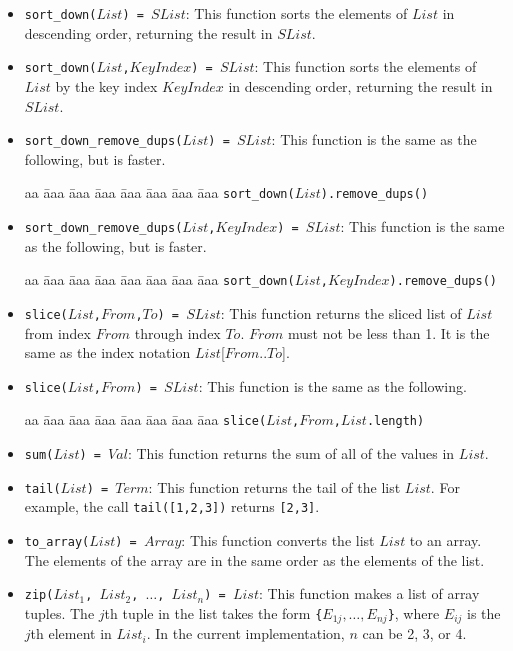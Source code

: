 \begin{itemize}
\item \texttt{sort\_down($List$) = $SList$}: This function sorts the elements of $List$ in descending order, returning the result in $SList$.

\item \texttt{sort\_down($List$,$KeyIndex$) = $SList$}: This function sorts the elements of $List$ by the key index $KeyIndex$ in descending order, returning the result in $SList$.

\item \texttt{sort\_down\_remove\_dups($List$) = $SList$}: This function is the same as the following, but is faster.
\begin{tabbing}
aa \= aaa \= aaa \= aaa \=aaa \= aaa \= aaa \= aaa \kill
\> \texttt{sort\_down($List$).remove\_dups()}
\end{tabbing}

\item \texttt{sort\_down\_remove\_dups($List$,$KeyIndex$) = $SList$}: This function is the same as the following, but is faster.
\begin{tabbing}
aa \= aaa \= aaa \= aaa \=aaa \= aaa \= aaa \= aaa \kill
\> \texttt{sort\_down($List$,$KeyIndex$).remove\_dups()}
\end{tabbing}

\item \texttt{slice($List$,$From$,$To$) = $SList$}: This function returns the sliced list of $List$ from index $From$ through index $To$. $From$ must not be less than 1. It is the same as the index notation $List$[$From$..$To$].

\item \texttt{slice($List$,$From$) = $SList$}: This function is the same as the following.
\begin{tabbing}
aa \= aaa \= aaa \= aaa \=aaa \= aaa \= aaa \= aaa \kill
\> \texttt{slice($List$,$From$,$List$.length)}
\end{tabbing}

\item \texttt{sum($List$) = $Val$}: This function returns the sum of all of the values in $List$. 
\item \texttt{tail($List$) = $Term$}: This function returns the tail of the list $List$.  For example, the call \texttt{tail([1,2,3])} returns \texttt{[2,3]}.
\item \texttt{to\_array($List$) = $Array$}: This function converts the list $List$ to an array.  The elements of the array are in the same order as the elements of the list.
\item \texttt{zip($List_1$, $List_2$, $\ldots$, $List_n$) = $List$}: This function makes a list of array tuples.  The $j$th tuple in the list takes the form \texttt{\{$E_{1j},\ldots,E_{nj}$\}}, where $E_{ij}$ is the $j$th element in $List_i$. In the current implementation, $n$ can be 2, 3, or 4.


\end{itemize}
